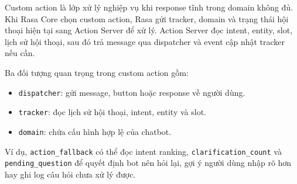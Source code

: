 Custom action là lớp xử lý nghiệp vụ khi response tĩnh trong domain không đủ. Khi Rasa Core chọn custom action, Rasa gửi tracker, domain và trạng thái hội thoại hiện tại sang Action Server để xử lý. Action Server đọc intent, entity, slot, lịch sử hội thoại, sau đó trả message qua dispatcher và event cập nhật tracker nếu cần.

Ba đối tượng quan trọng trong custom action gồm:

\begin{itemize}
    \item \texttt{dispatcher}: gửi message, button hoặc response về người dùng.
    \item \texttt{tracker}: đọc lịch sử hội thoại, intent, entity và slot.
    \item \texttt{domain}: chứa cấu hình hợp lệ của chatbot.
\end{itemize}

Ví dụ, \texttt{action\_fallback} có thể đọc intent ranking, \texttt{clarification\_count} và \texttt{pending\_question} để quyết định bot nên hỏi lại, gợi ý người dùng nhập rõ hơn hay ghi log câu hỏi chưa xử lý được.

